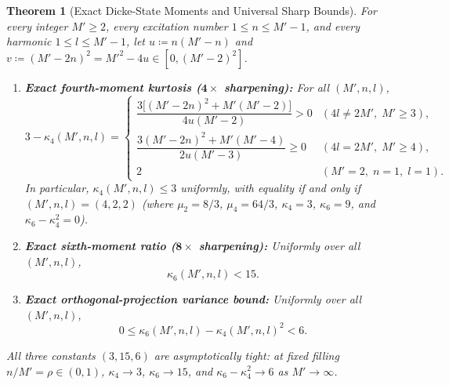 \documentclass[11pt,a4paper]{article}
\newtheorem{theorem}{Theorem}
\theoremstyle{remark}
\begin{document}
\begin{theorem}[Exact Dicke-State Moments and Universal Sharp Bounds]
\label{thm:A}
For every integer $M' \ge 2$, every excitation number $1 \le n \le M'-1$, and every harmonic $1 \le l \le M'-1$, let $u \coloneqq n(M'-n)$ and $v \coloneqq (M' - 2n)^2 = M'^2 - 4u \in [0, (M'-2)^2]$.
\begin{enumerate}
\item[\textnormal{(i)}] \textbf{Exact fourth-moment kurtosis ($\mathbf{4\times}$ sharpening):} For all $(M', n, l)$,
\begin{equation}
\label{eq:kappa4_exact}
3 - \kappa_4(M', n, l) = \begin{cases}
\dfrac{3\bigl[(M'-2n)^2 + M'(M'-2)\bigr]}{4 u (M'-2)} > 0 & (4l \neq 2M',\; M' \ge 3), \\[10pt]
\dfrac{3(M'-2n)^2 + M'(M'-4)}{2 u (M'-3)} \ge 0 & (4l = 2M',\; M' \ge 4), \\[6pt]
2 & (M'=2,\; n=1,\; l=1).
\end{cases}
\end{equation}
In particular, $\kappa_4(M', n, l) \le 3$ uniformly, with equality if and only if $(M', n, l) = (4, 2, 2)$ (where $\mu_2 = 8/3$, $\mu_4 = 64/3$, $\kappa_4 = 3$, $\kappa_6 = 9$, and $\kappa_6 - \kappa_4^2 = 0$).
\item[\textnormal{(ii)}] \textbf{Exact sixth-moment ratio ($\mathbf{8\times}$ sharpening):} Uniformly over all $(M', n, l)$,
\begin{equation}
\label{eq:kappa6_bound}
\kappa_6(M', n, l) < 15.
\end{equation}
\item[\textnormal{(iii)}] \textbf{Exact orthogonal-projection variance bound:} Uniformly over all $(M', n, l)$,
\begin{equation}
\label{eq:excess_var_bound}
0 \le \kappa_6(M', n, l) - \kappa_4(M', n, l)^2 < 6.
\end{equation}
\end{enumerate}
All three constants $(3, 15, 6)$ are asymptotically tight: at fixed filling $n/M' = \rho \in (0,1)$, $\kappa_4 \to 3$, $\kappa_6 \to 15$, and $\kappa_6 - \kappa_4^2 \to 6$ as $M' \to \infty$.
\end{theorem}
\end{document}
